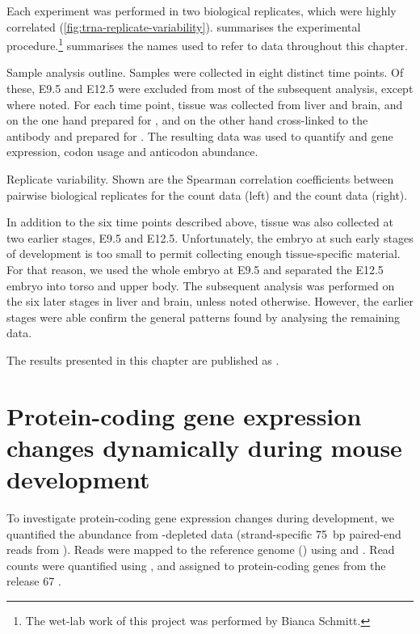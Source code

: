 Each experiment was performed in two biological replicates, which were highly
correlated (\cref{fig:trna-replicate-variability}).
 summarises the experimental
procedure.\footnote{The wet-lab work of this project was performed by Bianca
Schmitt.}  summarises the names used to refer to data
throughout this chapter.

    {Sample analysis outline.}
    {Samples were collected in eight distinct time points. Of these, E9.5 and
    E12.5 were excluded from most of the subsequent analysis, except where
    noted. For each time point, tissue was collected from liver and brain, and
    on the one hand prepared for \rnaseq, and on the other hand cross-linked to
    the  antibody and prepared for \chipseq. The resulting data was used to
    quantify \mrna and \trna gene expression, codon usage and \trna anticodon
    abundance.}

    {Replicate variability.}
    {Shown are the Spearman correlation coefficients between pairwise biological
    replicates for the \trna count data (left) and the \mrna count data (right).}

In addition to the six time points described above, tissue was also collected at
two earlier stages, E9.5 and E12.5. Unfortunately, the embryo at such early
stages of development is too small to permit collecting enough tissue-specific
material. For that reason, we used the whole embryo at E9.5 and separated the
E12.5 embryo into torso and upper body. The subsequent analysis was performed on
the six later stages in liver and brain, unless noted otherwise. However, the earlier stages were able confirm the general
patterns found by analysing the remaining data.

The results presented in this chapter are published as \citet{Schmitt:2014}.

\section{Protein-coding gene expression changes dynamically during mouse
development}

To investigate protein-coding gene expression changes during development, we
quantified the \mrna abundance from \rrna-depleted \rnaseq data (strand-specific
\SI{75}{bp} paired-end reads from  ). Reads were
mapped to the \mmu reference genome () using 
\citep{Fonseca:2014} and  \citep{Kim:2013}. Read counts were
quantified using  \citep{Anders:2014}, and assigned to
protein-coding genes from the  release \num{67}
\citep{Flicek:2014}.

